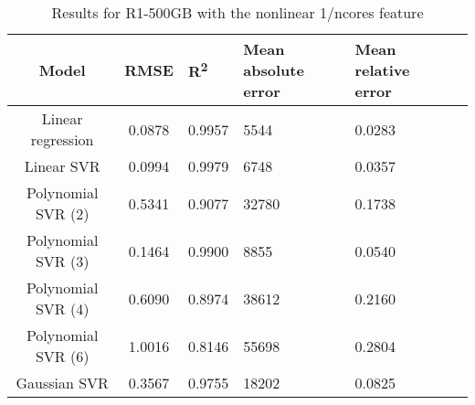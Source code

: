 \begin{table}[H]
\centering
\begin{adjustbox}{center}
\begin{tabular}{c | c M{1.2cm} M{2.5cm} M{2.5cm} M{1.8cm}}
Model & RMSE & R\textsuperscript{2} & Mean absolute error & Mean relative error \tabularnewline
\hline
Linear regression & 0.0878 & 0.9957 &   5544 & 0.0283 \\
Linear SVR & 0.0994 & 0.9979 &   6748 & 0.0357 \\
Polynomial SVR (2) & 0.5341 & 0.9077 &  32780 & 0.1738 \\
Polynomial SVR (3) & 0.1464 & 0.9900 &   8855 & 0.0540 \\
Polynomial SVR (4) & 0.6090 & 0.8974 &  38612 & 0.2160 \\
Polynomial SVR (6) & 1.0016 & 0.8146 &  55698 & 0.2804 \\
Gaussian SVR & 0.3567 & 0.9755 &  18202 & 0.0825 \\
\end{tabular}
\end{adjustbox}
\\
\caption{Results for R1-500GB with the nonlinear 1/ncores feature}
\label{tab:all_nonlinear_R1_500}
\end{table}
